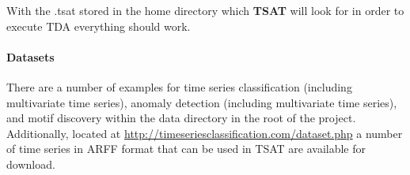 \documentclass[titlepage, letterpaper, 12pt]{article}
\newcommand\TSAT{\textbf{TSAT}}
\begin{document}
With the .tsat stored in the home directory which {\TSAT} will look for in order to execute TDA everything should work.

\paragraph{Datasets}

There are a number of examples for time series classification (including multivariate time series), anomaly detection (including multivariate time series), and motif discovery within the data directory in the root of the project.  Additionally, located at \url{http://timeseriesclassification.com/dataset.php} a number of time series in ARFF format that can be used in TSAT are available for download.



\end{document}
